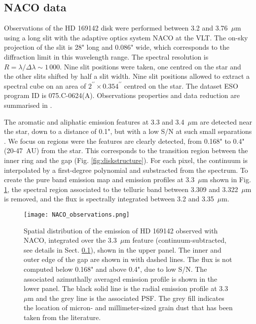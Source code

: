 \documentclass{aa}
\newcommand{\mic}{~$\mu$m\xspace}
\begin{document}
\subsection{NACO data} \label{sec:NACOdata}
Observations of the HD 169142 disk were performed between 3.2 and 3.76\mic using a long slit with the adaptive optics system NACO at the VLT. The on-sky projection of the slit is 28" long and 0.086" wide, which corresponds to the diffraction limit in this wavelength range. The  spectral resolution is $R = \lambda / \Delta \lambda \sim 1\,000$. Nine slit positions were taken, one centred on the star and the other slits shifted by half a slit width. Nine slit positions allowed to extract a spectral cube on an area of $2^{\prime\prime}\times0.354^{\prime\prime}$ centred on the star. 
The dataset ESO program ID is 075.C-0624(A). Observations properties and data reduction are summarised in \citet{Bouteraon_032019}.

The aromatic and aliphatic emission features at 3.3 and 3.4\mic are detected near the star, down to a distance of 0.1", but with a low S/N at such small separations \citep{Bouteraon_032019}. We focus on regions were the features are clearly detected, from 0.168" to 0.4" (20-47~AU) from the star. This corresponds to the transition region between the inner ring and the gap (Fig. \ref{fig:diskstructure}).
For each pixel, the continuum is interpolated by a first-degree polynomial and substracted from the spectrum. To create the pure band emission map and emission profiles at 3.3\mic shown in Fig. \ref{fig:naco}, the spectral region associated to the telluric band between 3.309 and 3.322\mic is removed, and the flux is spectrally integrated between 3.2 and 3.35\mic. 

\begin{figure}[!ht]
    \centering
    \texttt{[image: NACO\_observations.png]}
    \caption{\textit{} Spatial distribution of the emission of HD 169142 observed with NACO, integrated over the 3.3\mic feature (continuum-subtracted, see details  in Sect. \ref{sec:NACOdata}), shown in the upper panel. The inner and outer edge of the gap are shown in with dashed lines. The flux is not computed below 0.168" and above 0.4", due to low S/N. The associated azimuthally averaged emission profile is shown in the lower panel. The black solid line is the radial emission profile at 3.3\mic  and the grey line is the associated PSF. The grey fill indicates the location of micron- and millimeter-sized grain dust that has been taken from the literature.}
    \label{fig:naco}
\end{figure}
\end{document}
